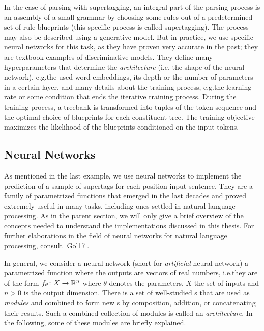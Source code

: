 \documentclass[../document.tex]{subfiles}
\begin{document}
    \begin{example}
        In the case of parsing with supertagging, an integral part of the parsing process is an assembly of a small grammar by choosing some rules out of a predetermined set of rule blueprints (this specific process is called supertagging).
        The process may also be described using a generative model.
        But in practice, we use specific neural networks for this task, as they have proven very accurate in the past; they are textbook examples of discriminative models.
        They define many hyperparameters that determine the \emph{architecture} (i.e. the shape of the neural network), e.g.\@ the used word embeddings, its depth or the number of parameters in a certain layer, and many details about the training process, e.g.\@ the learning rate or some condition that ends the iterative training process.
        During the training process, a treebank is transformed into tuples of the token sequence and the optimal choice of blueprints for each constituent tree.
        The training objective maximizes the likelihood of the blueprints conditioned on the input tokens.
    \end{example}

    \subsection{Neural Networks}
    As mentioned in the last example, we use neural networks to implement the prediction of a sample of supertags for each position input sentence.
    They are a family of parametrized functions that emerged in the last decades and proved extremely useful in many tasks, including ones settled in natural language processing. 
    As in the parent section, we will only give a brief overview of the concepts needed to understand the implementations discussed in this thesis.
    For further elaborations in the field of neural networks for natural language processing, consult \cref{Gol17}.

    In general, we consider a neural network (short  for \emph{artificial} neural network) a parametrized function where the outputs are vectors of real numbers, i.e.\@ they are of the form \(f_\theta\colon X \to \mathbb{R}^n\) where \(\theta\) denotes the parameters, \(X\) the set of inputs and \(n > 0\) is the output dimension.
    There is a set of well-studied s that are used as \emph{modules} and combined to form new s by composition, addition, or concatenating their results.
    Such a combined collection of modules is called an \emph{architecture}.
    In the following, some of these modules are briefly explained.
\end{document}
